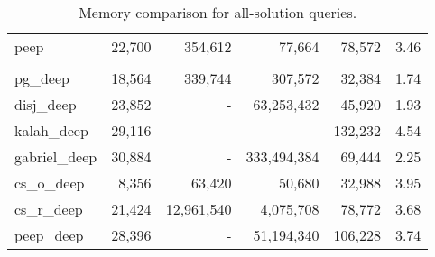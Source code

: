 \documentclass{./tlp}
\begin{document}
\begin{table}[t]
\begin{tabular}{|l|r|r|r|r|c|}
    \\\cline{1-6}             
    peep      & 22,700  & 354,612  & 77,664     & 78,572  & 3.46 
    \\\cline{1-6}
    \multicolumn{6}{c}{}
    \\[-2ex]\cline{1-6}             
    pg\_deep      & 18,564  & 339,744  & 307,572    & 32,384 & 1.74  
    \\\cline{1-6} 
    disj\_deep    & 23,852  & -       & 63,253,432  & 45,920 & 1.93  
    \\\cline{1-6} 
    kalah\_deep   & 29,116  & -       & -         & 132,232  & 4.54
    \\\cline{1-6} 
    gabriel\_deep & 30,884  & -       & 333,494,384 & 69,444 & 2.25  
    \\\cline{1-6} 
    cs\_o\_deep   & 8,356   & 63,420   & 50,680     & 32,988 & 3.95  
    \\\cline{1-6} 
    cs\_r\_deep   & 21,424  & 12,961,540 & 4,075,708   & 78,772 & 3.68  
    \\\cline{1-6} 
    peep\_deep    & 28,396  & -       & 51,194,340  & 106,228 & 3.74   
\\\cline{1-6}                                                              
  \end{tabular} 
  \caption{Memory comparison for all-solution queries.} 
\label{tab:memory-comparison} 


\bigskip


\end{table}
\end{document}

